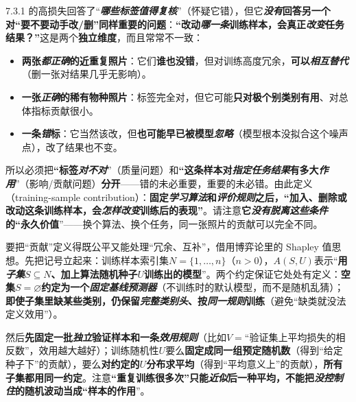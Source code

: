 7.3.1 的高损失回答了“\textbf{\emph{哪些标签值得复核}}”（怀疑它错），但它\textbf{\emph{没有}回答另一个对“要不要动手改/删”同样重要的问题}：\textbf{“改动\emph{哪一条}训练样本，会真正\emph{改变}任务结果？”}这是两个\textbf{独立维度}，而且常常不一致：
\begin{itemize}\item \textbf{两张\emph{都正确}的近重复照片}：它们\textbf{谁也没错}，但对训练高度冗余，\textbf{可以\emph{相互替代}}（删一张对结果几乎无影响）。\item \textbf{一张\emph{正确}的稀有物种照片}：标签完全对，但它可能\textbf{只对极个别类别有用}、对总体指标贡献很小。\item \textbf{一条\emph{错}标}：它当然该改，但\textbf{也可能早已被模型\emph{忽略}}（模型根本没拟合这个噪声点），改了结果也不变。\end{itemize}
所以必须把\textbf{“标签\emph{对不对}}”（质量问题）和\textbf{“这条样本对\emph{指定任务结果}有多大\emph{作用}}”（影响/贡献问题）\textbf{分开}——错的未必重要，重要的未必错。由此定义（training-sample contribution）：\textbf{固定\emph{学习算法}和\emph{评价规则}之后，“加入、删除或改动这条训练样本，会\emph{怎样改变}训练后的表现”}。请注意\textbf{它\emph{没有脱离这些条件}的“永久价值}”——换个算法、换个任务，同一张照片的贡献可以完全不同。

要把“贡献”定义得既公平又能处理“冗余、互补”，借用博弈论里的 Shapley 值思想。先把记号立起来：训练样本索引集$N=\{1,\ldots,n\}$（$n>0$），$A(S,U)$表示“\textbf{用\emph{子集}$S\subseteq N$、加上算法随机种子$U$训练出的模型}”。两个约定保证它处处有定义：\textbf{空集$S=\varnothing$约定为一个\emph{固定基线预测器}}（不训练时的默认模型，而不是随机乱猜）；\textbf{即使子集里缺某些类别，仍保留\emph{完整类别头}、按\emph{同一规则}训练}（避免“缺类就没法定义效用”）。

然后\textbf{先固定一批\emph{独立}验证样本和一条\emph{效用规则}}（比如$V=$“验证集上平均损失的相反数”，效用越大越好）；训练随机性$U$要么\textbf{固定成同一组预定随机数}（得到“给定种子下”的贡献），要么\textbf{对约定的$U$分布求平均}（得到“平均意义上”的贡献），\textbf{所有子集都用同一约定}。注意\textbf{“重复训练很多次”只能\emph{近似}后一种平均，不能把\emph{没控制住}的随机波动当成“样本的作用}”。

